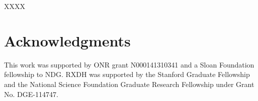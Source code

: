 \documentclass[10pt,letterpaper]{article}
\begin{document}
XXXX

\section{\bf Acknowledgments}
\small
This work was supported by ONR grant N000141310341 and a Sloan Foundation fellowship to NDG. RXDH was supported by the Stanford Graduate Fellowship and the National Science Foundation Graduate Research Fellowship under Grant No. DGE-114747.


\setlength{\bibleftmargin}{.125in}
\setlength{\bibindent}{-\bibleftmargin}


\end{document}
